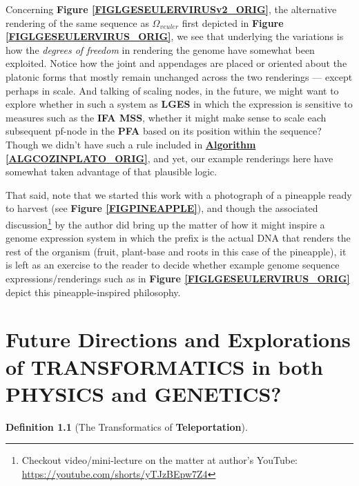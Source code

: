 \documentclass[a4paper, 18pt]{book} %
\newtheorem{defn}{Definition}
\begin{document}
\begin{appendices}
Concerning \textbf{Figure \ref{FIGLGESEULERVIRUSv2_ORIG}}, the alternative rendering  of the same sequence as $\Omega_{veuler}$ first depicted in \textbf{Figure \ref{FIGLGESEULERVIRUS_ORIG}}, we see that underlying the variations is how the \textit{degrees of freedom} in rendering the genome have somewhat been exploited. Notice how the joint and appendages are placed or oriented about the platonic forms that mostly remain unchanged across the two renderings --- except perhaps in scale. And talking of scaling nodes, in the future, we might want to explore whether in such a system as \textbf{LGES} in which the expression is sensitive to measures such as the \textbf{IFA MSS}, whether it might make sense to scale each subsequent pf-node in the \textbf{PFA} based on its position within the sequence? Though we didn't have such a rule included in \textbf{\hyperref[ALGCOZINPLATO_ORIG]{Algorithm \ref{ALGCOZINPLATO_ORIG}}}, and yet, our example renderings here have somewhat taken advantage of that plausible logic.

That said, note that we started this work with a photograph of a pineapple ready to harvest (see \textbf{Figure \ref{FIGPINEAPPLE}}), and though the associated discussion\footnote{Checkout video/mini-lecture on the matter at author's YouTube: \url{https://youtube.com/shorts/yTJzBEpw7Z4}} by the author did bring up the matter of how it might inspire a genome expression system in which the prefix is the actual DNA that renders the rest of the organism (fruit, plant-base and roots in this case of the pineapple), it is left as an exercise to the reader to decide whether example genome sequence expressions/renderings such as in \textbf{Figure \ref{FIGLGESEULERVIRUS_ORIG}} depict this pineapple-inspired philosophy.


\chapter{Future Directions and Explorations of TRANSFORMATICS in both PHYSICS and GENETICS?}
\label{SECFUTDIRECT}


\begin{defn}[The Transformatics of \textbf{Teleportation}]


\end{defn}
\end{appendices}
\end{document}
